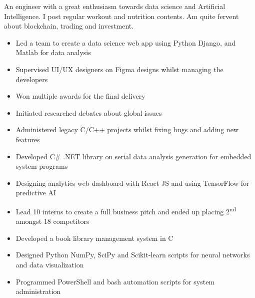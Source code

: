 \documentclass[11pt,a4paper,ragged2e]{altacv}
\begin{document}
\begin{paracol}{1}
\smallskip
{}

An engineer with a great enthusiasm towards data science and Artificial Intelligence. I post regular workout and nutrition contents. Am quite fervent about blockchain, trading and investment. \smallskip



\begin{itemize}
\item Led a team to create a data science web app using Python Django, and Matlab for data analysis
\item Supervised UI/UX designers on Figma designs whilst managing the developers
\item Won multiple awards for the final delivery
\item Initiated researched debates about global issues
\end{itemize}
\tightdivider

\begin{itemize}
\item Administered legacy C/C++ projects whilst fixing bugs and adding new features
\item Developed C\# .NET library on serial data analysis generation for embedded system programs
\item Designing analytics web dashboard with React JS and using TensorFlow for predictive AI 
\item Lead 10 interns to create a full business pitch and ended up placing  2\textsuperscript{nd} amongst 18 competitors
\end{itemize}
\tightdivider

\begin{itemize}
\item Developed a book library management system in C 
\item Designed Python NumPy, SciPy and Scikit-learn scripts for neural networks and data visualization
\item Programmed PowerShell and bash automation scripts for system administration
\end{itemize}
\tightdivider


\end{paracol}
\end{document}
